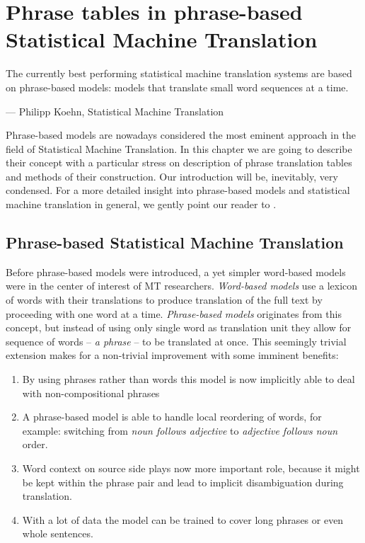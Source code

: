 
\chapter{Phrase tables in phrase-based Statistical Machine Translation}
\label{chap:phrase-based}


\setlength{\epigraphwidth}{1.0\textwidth}
\epigraph{The currently best performing statistical machine translation systems are based on
phrase-based models: models that translate small word sequences at a time.}{--- Philipp Koehn, Statistical Machine Translation}

Phrase-based models are nowadays considered the most eminent approach
in the field of Statistical Machine Translation.
In this chapter we are going to describe their concept with a particular stress
on description of phrase translation tables and methods of their construction.
Our introduction will be, inevitably, very condensed.
For a more detailed insight into phrase-based models and statistical machine
translation in general, we gently point our reader to \citet{koehn:smt}.

\section{Phrase-based Statistical Machine Translation}

Before phrase-based models were introduced, a yet simpler word-based models were in
the center of interest of MT researchers.
\emph{Word-based models} use a lexicon of words with their translations to produce
translation of the full text by proceeding with one word at a time.
\emph{Phrase-based models} originates from this concept, but instead of using only
single word as translation unit they allow for sequence of words -- \emph{a phrase}
-- to be translated at once.
This seemingly trivial extension makes for a non-trivial improvement with some
imminent benefits:
\begin{enumerate}
  \item By using phrases rather than words this model is now implicitly able to deal
    with non-compositional phrases
  \item A phrase-based model is able to handle local reordering of words, for example:
    switching from \emph{noun follows adjective} to \emph{adjective follows noun} order.
  \item Word context on source side plays now more important role, because it might be kept
    within the phrase pair and lead to implicit disambiguation during translation.
  \item With a lot of data the model can be trained to cover long phrases or even
    whole sentences.
\end{enumerate}

